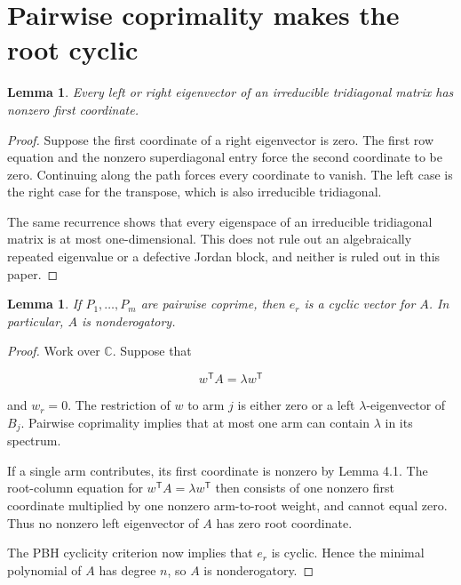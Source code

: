 \documentclass[11pt]{article}
\newtheorem{lemma}[theorem]{Lemma}
\theoremstyle{remark}
\begin{document}
\section{Pairwise coprimality makes the root cyclic}

\begin{lemma}

Every left or right eigenvector of an irreducible tridiagonal matrix has nonzero first coordinate.
\end{lemma}

\begin{proof}

Suppose the first coordinate of a right eigenvector is zero. The first row equation and the nonzero superdiagonal entry force the second coordinate to be zero. Continuing along the path forces every coordinate to vanish. The left case is the right case for the transpose, which is also irreducible tridiagonal.

The same recurrence shows that every eigenspace of an irreducible tridiagonal matrix is at most one-dimensional. This does not rule out an algebraically repeated eigenvalue or a defective Jordan block, and neither is ruled out in this paper.
\end{proof}

\begin{lemma}

If $P_1,\ldots,P_m$ are pairwise coprime, then $e_r$ is a cyclic vector for $A$. In particular, $A$ is nonderogatory.
\end{lemma}

\begin{proof}

Work over $\mathbb C$. Suppose that

\[
w^{\mathsf T}A=\lambda w^{\mathsf T}
\]

and $w_r=0$. The restriction of $w$ to arm $j$ is either zero or a left $\lambda$-eigenvector of $B_j$. Pairwise coprimality implies that at most one arm can contain $\lambda$ in its spectrum.

If a single arm contributes, its first coordinate is nonzero by Lemma 4.1. The root-column equation for $w^{\mathsf T}A=\lambda w^{\mathsf T}$ then consists of one nonzero first coordinate multiplied by one nonzero arm-to-root weight, and cannot equal zero. Thus no nonzero left eigenvector of $A$ has zero root coordinate.

The PBH cyclicity criterion \cite[Chapter 6]{ref10} now implies that $e_r$ is cyclic. Hence the minimal polynomial of $A$ has degree $n$, so $A$ is nonderogatory.
\end{proof}
\end{document}
